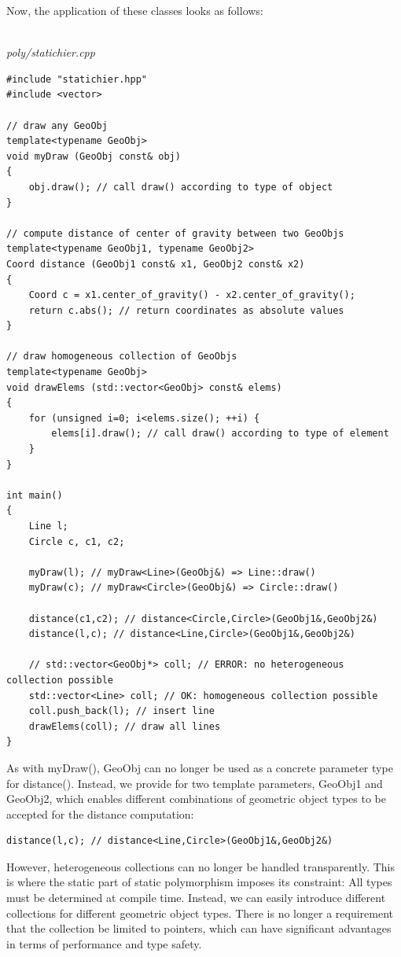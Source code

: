 Now, the application of these classes looks as follows:

\hspace*{\fill} \\ %
\noindent
\textit{poly/statichier.cpp}
\begin{lstlisting}[style=styleCXX]
#include "statichier.hpp"
#include <vector>

// draw any GeoObj
template<typename GeoObj>
void myDraw (GeoObj const& obj)
{
	obj.draw(); // call draw() according to type of object
}

// compute distance of center of gravity between two GeoObjs
template<typename GeoObj1, typename GeoObj2>
Coord distance (GeoObj1 const& x1, GeoObj2 const& x2)
{
	Coord c = x1.center_of_gravity() - x2.center_of_gravity();
	return c.abs(); // return coordinates as absolute values
}

// draw homogeneous collection of GeoObjs
template<typename GeoObj>
void drawElems (std::vector<GeoObj> const& elems)
{
	for (unsigned i=0; i<elems.size(); ++i) {
		elems[i].draw(); // call draw() according to type of element
	}
}

int main()
{
	Line l;
	Circle c, c1, c2;
	
	myDraw(l); // myDraw<Line>(GeoObj&) => Line::draw()
	myDraw(c); // myDraw<Circle>(GeoObj&) => Circle::draw()
	
	distance(c1,c2); // distance<Circle,Circle>(GeoObj1&,GeoObj2&)
	distance(l,c); // distance<Line,Circle>(GeoObj1&,GeoObj2&)
	
	// std::vector<GeoObj*> coll; // ERROR: no heterogeneous collection possible
	std::vector<Line> coll; // OK: homogeneous collection possible
	coll.push_back(l); // insert line
	drawElems(coll); // draw all lines
}
\end{lstlisting}

As with myDraw(), GeoObj can no longer be used as a concrete parameter type for distance(). Instead, we provide for two template parameters, GeoObj1 and GeoObj2, which enables different combinations of geometric object types to be accepted for the distance computation:

\begin{lstlisting}[style=styleCXX]
distance(l,c); // distance<Line,Circle>(GeoObj1&,GeoObj2&)
\end{lstlisting}

However, heterogeneous collections can no longer be handled transparently. This is where the static part of static polymorphism imposes its constraint: All types must be determined at compile time. Instead, we can easily introduce different collections for different geometric object types. There is no longer a requirement that the collection be limited to pointers, which can have significant advantages in terms of performance and type safety.


















